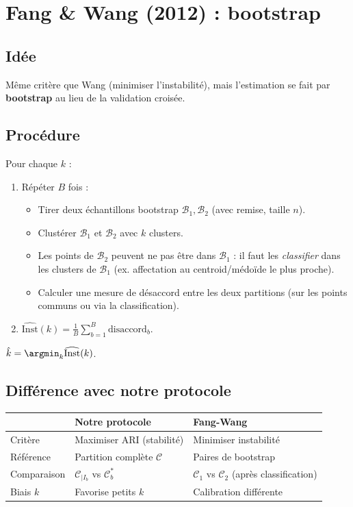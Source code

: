 \documentclass[11pt, a4paper]{article}
\begin{document}
\section{Fang \& Wang (2012) : bootstrap}

\subsection{Idée}

Même critère que Wang (minimiser l'instabilité), mais l'estimation se fait par \textbf{bootstrap} au lieu de la validation croisée.

\subsection{Procédure}

Pour chaque $k$ :
\begin{enumerate}
  \item Répéter $B$ fois :
  \begin{itemize}
    \item Tirer deux échantillons bootstrap $\mathcal{B}_1, \mathcal{B}_2$ (avec remise, taille $n$).
    \item Clustérer $\mathcal{B}_1$ et $\mathcal{B}_2$ avec $k$ clusters.
    \item Les points de $\mathcal{B}_2$ peuvent ne pas être dans $\mathcal{B}_1$ : il faut les \emph{classifier} dans les clusters de $\mathcal{B}_1$ (ex. affectation au centroid/médoïde le plus proche).
    \item Calculer une mesure de désaccord entre les deux partitions (sur les points communs ou via la classification).
  \end{itemize}
  \item $\widehat{\text{Inst}}(k) = \frac{1}{B}\sum_{b=1}^B \text{disaccord}_b$.
\end{enumerate}

$\hat{k} = \argmin_k \widehat{\text{Inst}}(k)$.

\subsection{Différence avec notre protocole}

\begin{center}
\begin{tabular}{lll}
  \hline
  & Notre protocole & Fang-Wang \\
  \hline
  Critère & Maximiser ARI (stabilité) & Minimiser instabilité \\
  Référence & Partition complète $\mathcal{C}$ & Paires de bootstrap \\
  Comparaison & $\mathcal{C}_{|I_b}$ vs $\mathcal{C}_b^*$ & $\mathcal{C}_1$ vs $\mathcal{C}_2$ (après classification) \\
  Biais $k$ & Favorise petits $k$ & Calibration différente \\
  \hline
\end{tabular}
\end{center}
\end{document}
